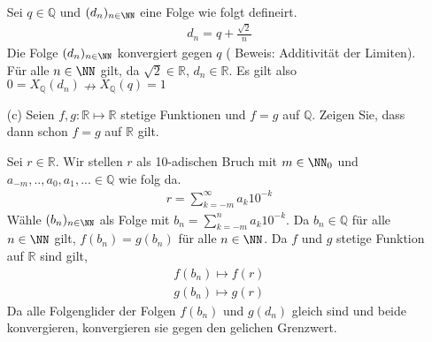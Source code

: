 \begin{itemize}
		Sei $ q \in \mathbb{ Q } $ und $ (d_n)_{ n \in \NN } $ eine Folge wie folgt defineirt.
		\begin{align*}
			d_n = q + \frac{ \sqrt{ 2 } }{ n }
		\end{align*}
		Die Folge $ (d_n)_{ n \in \NN } $ konvergiert gegen $ q $ ( Beweis: Additivität der Limiten).
		Für alle $ n \in \NN $ gilt, da $ \sqrt{ 2 } \in \mathbb{ R } $, $ d_n \in \mathbb{ R } $.
		Es gilt also $ 0 =  X_{ \mathbb{ Q } }( d_n ) \nrightarrow X_{ \mathbb{ Q } }( q ) = 1 $


		\item[(c)] 
		Seien $ f, g : \mathbb{ R } \mapsto \mathbb{ R } $ stetige Funktionen und $ f = g $ auf $ \mathbb{ Q } $.
		Zeigen Sie, dass dann schon $ f = g $ auf $ \mathbb{ R } $ gilt.

		Sei $ r \in \mathbb{ R } $.
		Wir stellen $ r $ als 10-adischen Bruch mit $ m \in \NN_0 $ und $ a_{-m}, .., a_0, a_1, ... \in \mathbb{ Q } $ wie folg da.
		\begin{align*}
			r = \sum_{ k = -m }^\infty a_k 10^{-k}
		\end{align*}
		Wähle $ (b_n)_{n \in \NN} $ als Folge mit $ b_n = \sum_{ k = -m }^n a_k 10^{-k} $.
		Da $ b_n \in \mathbb{ Q } $ für alle $ n \in \NN $ gilt, $f( b_n ) = g ( b_n ) $ für alle $ n \in \NN $.
		Da $ f $ und $ g $ stetige Funktion auf $ \mathbb{ R } $ sind gilt, 
		\begin{align*}
			f( b_ n ) \mapsto f( r ) \\
			g( b_ n ) \mapsto g( r )
		\end{align*}
		Da alle Folgenglider der Folgen $ f( b_n ) $ und $ g( d_n ) $ gleich sind und beide konvergieren, konvergieren sie gegen den gelichen Grenzwert.

	\end{itemize}


